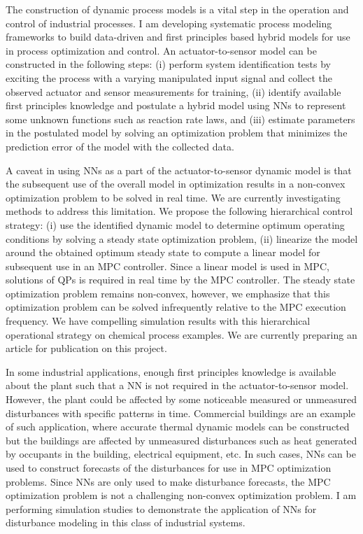 \documentclass[11pt, a4paper]{article} %
\begin{document}
The construction of dynamic process models is a vital step in the operation and 
control of industrial processes. I am developing systematic process modeling 
frameworks to build data-driven and first principles based hybrid
models for use in process optimization and control. An actuator-to-sensor 
model can be constructed in the following steps: (i) perform system 
identification tests by exciting the process with a varying manipulated input 
signal and collect the observed actuator and sensor measurements for training, 
(ii) identify available first principles knowledge and postulate a hybrid model 
using NNs to represent some unknown functions such as reaction rate laws, and 
(iii) estimate parameters in the postulated model by solving an optimization 
problem that minimizes the prediction error of the model with the collected 
data.

A caveat in using NNs as a part of the actuator-to-sensor dynamic model is that 
the subsequent use of the overall model in optimization results in a non-convex 
optimization problem to be solved in real time. We are currently investigating 
methods to address this limitation. We propose the following hierarchical 
control strategy: (i) use the identified dynamic model to determine optimum 
operating conditions by solving a steady state optimization problem, (ii) 
linearize the model around the obtained optimum steady state to compute a 
linear model for subsequent use in an MPC controller. Since a linear model is 
used in  MPC, solutions of QPs is required in real time by the MPC controller. 
The steady state optimization problem remains non-convex, however, we emphasize 
that this optimization problem can be solved infrequently relative to the MPC 
execution frequency. We have compelling simulation results with this 
hierarchical operational strategy on chemical process examples. We are 
currently preparing an article for publication on this project.

In some industrial applications, enough first principles knowledge is available 
about the plant such that a NN is not required in the actuator-to-sensor model. 
However, the plant could be affected by some noticeable measured or unmeasured 
disturbances with specific patterns in time. Commercial buildings are an 
example of such application, where accurate thermal dynamic models can be 
constructed but the buildings are affected by unmeasured disturbances such as 
heat generated by occupants in the building, electrical equipment, etc. In such 
cases, NNs can be used to construct forecasts of the disturbances for use in 
MPC optimization problems. Since NNs are only used to make disturbance 
forecasts, the MPC optimization problem is not a challenging non-convex 
optimization problem. I am performing simulation studies to demonstrate the 
application of NNs for disturbance modeling in this class of industrial systems.
\end{document}
